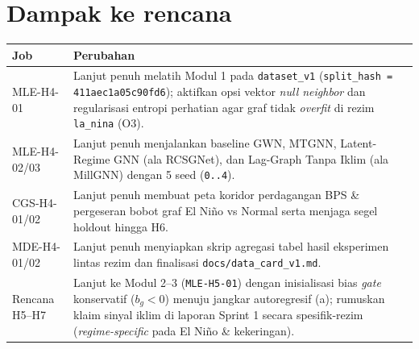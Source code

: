 \documentclass[11pt,a4paper]{article}
\begin{document}
\section{Dampak ke rencana}
\begin{table}[H]
\centering
\small
\begin{tabular}{@{}L{3.6cm}L{10.8cm}@{}}
\toprule
Job & Perubahan \\
\midrule
MLE-H4-01 & Lanjut penuh melatih Modul 1 pada \texttt{dataset\_v1} (\texttt{split\_hash = 411aec1a05c90fd6}); aktifkan opsi vektor \textit{null neighbor} dan regularisasi entropi perhatian agar graf tidak \textit{overfit} di rezim \texttt{la\_nina} (O3). \\
MLE-H4-02/03 & Lanjut penuh menjalankan baseline GWN, MTGNN, Latent-Regime GNN (ala RCSGNet), dan Lag-Graph Tanpa Iklim (ala MillGNN) dengan 5 seed (\texttt{0..4}). \\
CGS-H4-01/02 & Lanjut penuh membuat peta koridor perdagangan BPS \& pergeseran bobot graf El Ni\~no vs Normal serta menjaga segel holdout hingga H6. \\
MDE-H4-01/02 & Lanjut penuh menyiapkan skrip agregasi tabel hasil eksperimen lintas rezim dan finalisasi \texttt{docs/data\_card\_v1.md}. \\
Rencana H5--H7 & Lanjut ke Modul 2--3 (\texttt{MLE-H5-01}) dengan inisialisasi bias \textit{gate} konservatif ($b_g < 0$) menuju jangkar autoregresif (a); rumuskan klaim sinyal iklim di laporan Sprint 1 secara spesifik-rezim (\textit{regime-specific} pada El Ni\~no \& kekeringan). \\
\bottomrule
\end{tabular}
\end{table}
\end{document}
